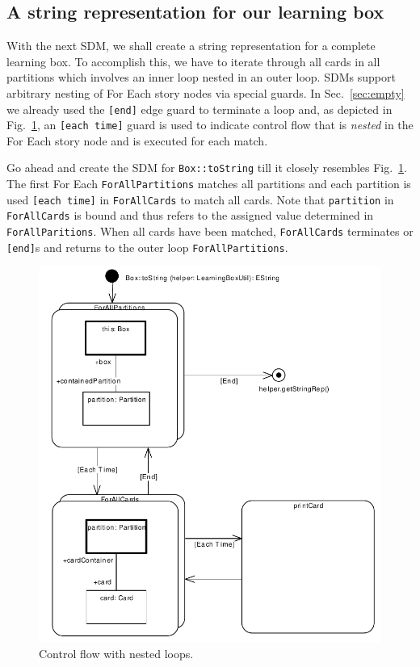 \subsection{A string representation for our learning box}

With the next SDM, we shall create a string representation for a complete
learning box. To accomplish this, we have to iterate through all cards in all
partitions which involves an inner loop nested in an outer loop.  SDMs support arbitrary nesting
of For Each story nodes via special guards.  In Sec.~\ref{sec:empty} we already
used the \texttt{[end]} edge guard to terminate a loop and, as depicted in
Fig.~\ref{fig:sdm_tostring_1}, an \texttt{[each time]} guard is used to indicate
control flow that is \emph{nested} in the For Each story node and is executed
for each match.

Go ahead and create the SDM for \texttt{Box::toString} till it closely resembles
Fig.~\ref{fig:sdm_tostring_1}.  The first For Each \texttt{ForAllPartitions}
matches all partitions and each partition is used \texttt{[each time]} in
\texttt{ForAllCards} to match all cards.  Note that \texttt{partition} in
\texttt{ForAllCards} is bound  and thus refers to the assigned value determined
in \texttt{ForAllParitions}.  When all cards have been matched,
\texttt{ForAllCards} terminates or \texttt{[end]}s and returns to the outer loop
\texttt{ForAllPartitions}.

\begin{figure}[htbp]
\begin{center}
  \includegraphics[width=\textwidth]{pics/sdmBilder/toString/sdm72.pdf}
  \caption{Control flow with nested loops.}  
  \label{fig:sdm_tostring_1}
\end{center}
\end{figure}

